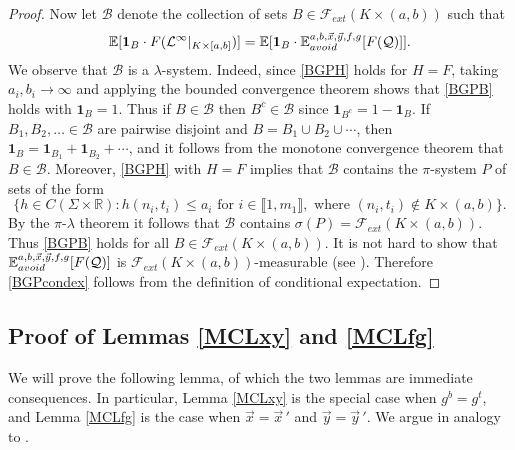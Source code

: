 \begin{proof}
	Now let $\mathcal{B}$ denote the collection of sets $B\in\mathcal{F}_{ext}(K\times(a,b))$ such that
	\begin{equation}\label{BGPB}
	\mathbb{E}[\mathbf{1}_B \cdot F(\mathcal{L}^\infty|_{K\times[a,b]})] = \mathbb{E}[\mathbf{1}_B \cdot \mathbb{E}^{a,b,\vec{x},\vec{y},f,g}_{avoid}[F(\mathcal{Q})]].
	\end{equation}
	We observe that $\mathcal{B}$ is a $\lambda$-system. Indeed, since \eqref{BGPH} holds for $H=F$, taking $a_i,b_i\to\infty$ and applying the bounded convergence theorem shows that \eqref{BGPB} holds with $\mathbf{1}_B = 1$. Thus if $B\in\mathcal{B}$ then $B^c\in\mathcal{B}$ since $\mathbf{1}_{B^c} = 1-\mathbf{1}_B$. If $B_1,B_2,\dots\in\mathcal{B}$ are pairwise disjoint and $B=B_1\cup B_2\cup\cdots$, then $\mathbf{1}_B = \mathbf{1}_{B_1} + \mathbf{1}_{B_2} + \cdots$, and it follows from the monotone convergence theorem that $B\in\mathcal{B}$. Moreover, \eqref{BGPH} with $H=F$ implies that $\mathcal{B}$ contains the $\pi$-system $P$ of sets of the form
	\[
	\{h\in C(\Sigma\times\mathbb{R}) : h(n_i,t_i) \leq a_i \mbox{ for } i \in\llbracket 1,m_1\rrbracket, \mbox{ where } (n_i,t_i)\notin K\times(a,b)\}.
	\]
	By the $\pi$-$\lambda$ theorem \cite[Theorem 2.1.6]{Durrett} it follows that $\mathcal{B}$ contains $\sigma(P) = \mathcal{F}_{ext}(K\times(a,b))$. Thus \eqref{BGPB} holds for all $B\in\mathcal{F}_{ext}(K\times(a,b))$. It is not hard to show that $\mathbb{E}^{a,b,\vec{x},\vec{y},f,g}_{avoid}[F(\mathcal{Q})]$ is $\mathcal{F}_{ext}(K\times(a,b))$-measurable (see \cite[Lemma 3.4]{DimMat}). Therefore \eqref{BGPcondex} follows from the definition of conditional expectation.
	
\end{proof}

\subsection{Proof of Lemmas \ref{MCLxy} and \ref{MCLfg}}

We will prove the following lemma, of which the two lemmas are immediate consequences. In particular, Lemma \ref{MCLxy} is the special case when $g^b = g^t$, and Lemma \ref{MCLfg} is the case when $\vec{x} = \vec{x}\,'$ and $\vec{y} = \vec{y}\,'$. We argue in analogy to \cite[Lemma 5.6]{DimMat}.

